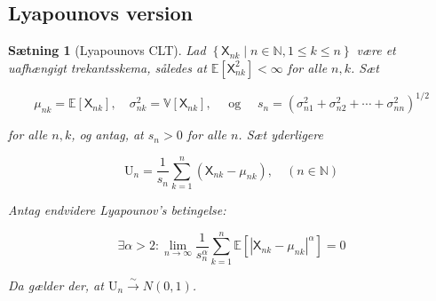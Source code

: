 \documentclass{article}
\newcommand{\1}{\mathbbm{1}}
\newcommand{\X}{\mathsf{X}}
\theoremstyle{boxed}
\newtheorem{proposition}[theorem]{Sætning}
\begin{document}
\subsection{Lyapounovs version}
\begin{theorem-box}
    \begin{proposition}[Lyapounovs CLT]
        Lad $\left\{\X_{n k} \mid n \in \mathbb{N}, 1 \leq k \leq n\right\}$ være et uafhængigt trekantsskema, således at $\mathbb{E}\left[\X_{n k}^2\right]<\infty$ for alle $n, k$. Sæt

$$
\mu_{n k}=\mathbb{E}\left[\X_{n k}\right], \quad \sigma_{n k}^2=\mathbb{V}\left[\X_{n k}\right], \quad \text { og } \quad s_n=\left(\sigma_{n 1}^2+\sigma_{n 2}^2+\cdots+\sigma_{n n}^2\right)^{1 / 2}
$$

for alle $n, k$, og antag, at $s_n>0$ for alle $n$.
Sæt yderligere

$$
\mathrm{U}_n=\frac{1}{s_n} \sum_{k=1}^n\left(\X_{n k}-\mu_{n k}\right), \quad(n \in \mathbb{N})
$$


Antag endvidere Lyapounov's betingelse:

$$
\exists \alpha>2: \lim _{n \rightarrow \infty} \frac{1}{s_n^\alpha} \sum_{k=1}^n \mathbb{E}\left[\left|\X_{n k}-\mu_{n k}\right|^\alpha\right]=0
$$


Da gælder der, at $\mathrm{U}_n \xrightarrow{\sim} N(0,1)$.
    \end{proposition}
\end{theorem-box}
\end{document}
